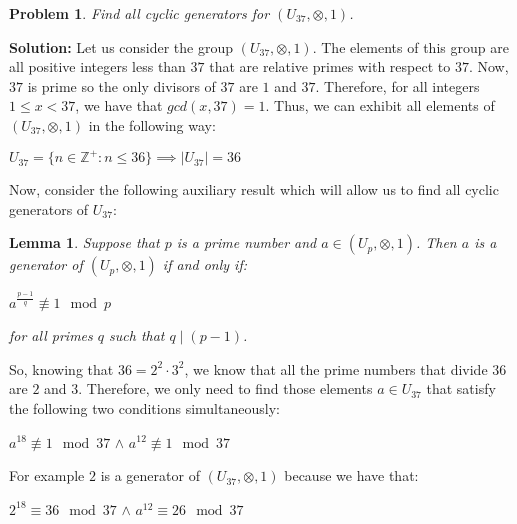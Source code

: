 \documentclass[a4paper,openany,11pt]{book}
\newtheorem{Lemma}{Lemma}
\newtheorem{Prob}{Problem}
\begin{document}
	
	\begin{center}
	\end{center}

\begin{Prob}
	Find all cyclic generators for $(U_{37}, \otimes, 1)$.
\end{Prob}

\textbf{Solution:} Let us consider the group $(U_{37}, \otimes, 1)$. The elements of this group are all positive integers less than $37$ that are relative primes with respect to $37$. Now, $37$ is prime so the only divisors of $37$ are $1$ and $37$. Therefore, for all integers $1 \leq x < 37$, we have that $gcd(x,37) = 1$. Thus, we can exhibit all elements of $(U_{37}, \otimes, 1)$ in the following way:

\begin{center}
	$U_{37} = \lbrace n \in \mathbb{Z}^{+} : n \leq 36 \rbrace \implies \left|U_{37}\right| = 36$
\end{center} 

Now, consider the following auxiliary result which will allow us to find all cyclic generators of $U_{37}$:

\begin{Lemma}
	Suppose that $p$ is a prime number and $a \in (U_{p},\otimes, 1)$. Then $a$ is a generator of $(U_{p},\otimes, 1)$ if and only if:
	
	\begin{center}
		$a^{\frac{p-1}{q}} \not \equiv 1 \mod p$
	\end{center}

	for all primes $q$ such that $q \mid (p-1)$.
\end{Lemma}

So, knowing that $36 = 2^{2}\cdot3^{2}$, we know that all the prime numbers that divide $36$ are $2$ and $3$. Therefore, we only need to find those elements $a \in 
U_{37}$ that satisfy the following two conditions simultaneously:

\begin{center}
	$a^{18} \not \equiv 1 \mod 37$ \hspace{0.1cm} $\wedge$ \hspace{0.1cm} $a^{12} \not \equiv 1 \mod 37$
\end{center}

For example $2$ is a generator of $(U_{37},\otimes, 1)$ because we have that:

\begin{center}
	$2^{18} \equiv 36 \mod 37$ \hspace{0.1cm} $\wedge$ \hspace{0.1cm} $a^{12} \equiv 26 \mod 37$
\end{center}
\end{document}
